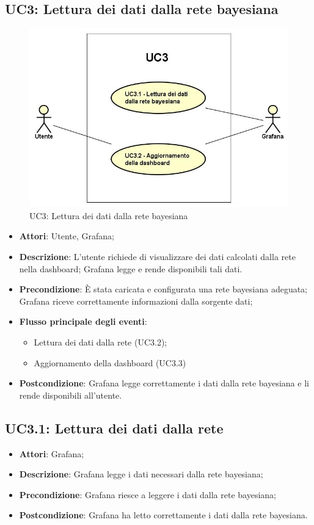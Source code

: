 \subsection{UC3: Lettura dei dati dalla rete bayesiana}
\hypertarget{UC3}{}
\begin{figure} [H]
	\centering
	\includegraphics[scale=0.45]{Img/UC3}
	\caption{UC3: Lettura dei dati dalla rete bayesiana}\label{}
\end{figure}
\begin{itemize}
	\item \textbf{Attori}: Utente, Grafana;
	\item \textbf{Descrizione}: L'utente richiede di visualizzare dei dati calcolati dalla rete nella dashboard; Grafana legge e rende disponibili tali dati.
	\item \textbf{Precondizione}: È stata caricata e configurata una rete bayesiana adeguata; Grafana riceve correttamente informazioni dalla sorgente dati;
	\item \textbf{Flusso principale degli eventi}:
	\begin{itemize}
		\item Lettura dei dati dalla rete (UC3.2);
		\item Aggiornamento della dashboard (UC3.3)
	\end{itemize}
	\item \textbf{Postcondizione}: Grafana legge correttamente i dati dalla rete bayesiana e li rende disponibili all'utente.
\end{itemize}
\subsection{UC3.1: Lettura dei dati dalla rete}
\hypertarget{UC3.1}{}
\begin{itemize}
	\item \textbf{Attori}: Grafana;
	\item \textbf{Descrizione}: Grafana legge i dati necessari dalla rete bayesiana;
	\item \textbf{Precondizione}: Grafana riesce a leggere i dati dalla rete bayesiana;
	\item \textbf{Postcondizione}: Grafana ha letto correttamente i dati dalla rete bayesiana.
\end{itemize}
